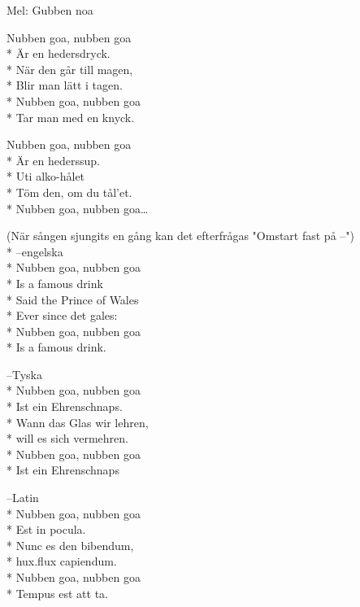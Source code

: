 \begin{SongText}
    \begin{SongInfo}
        Mel: Gubben noa
    \end{SongInfo}
    \begin{SongVerse}
        Nubben goa, nubben goa\\*%
        Är en hedersdryck.\\*%
        När den går till magen,\\*%
        Blir man lätt i tagen.\\*%
        Nubben goa, nubben goa\\*%
        Tar man med en knyck.
    \end{SongVerse}
    \begin{SongVerse}
        Nubben goa, nubben goa\\*%
        Är en hederssup.\\*%
        Uti alko-hålet\\*%
        Töm den, om du tål’et.\\*%
        Nubben goa, nubben goa…
    \end{SongVerse}
    \begin{SongVerse}
        (När sången sjungits en gång kan det efterfrågas "Omstart fast på --")\\*%
        --engelska\\*%
        Nubben goa, nubben goa\\*%
        Is a famous drink\\*%
        Said the Prince of Wales\\*%
        Ever since det gales:\\*%
        Nubben goa, nubben goa\\*%
        Is a famous drink.
    \end{SongVerse}
    \begin{SongVerse}
        --Tyska\\*%
        Nubben goa, nubben goa\\*%
        Ist ein Ehrenschnaps.\\*%
        Wann das Glas wir lehren,\\*%
        will es sich vermehren.\\*%
        Nubben goa, nubben goa\\*%
        Ist ein Ehrenschnaps
    \end{SongVerse}
    \begin{SongVerse}
        --Latin\\*%
        Nubben goa, nubben goa\\*%
        Est in pocula.\\*%
        Nunc es den bibendum,\\*%
        hux.flux capiendum.\\*%
        Nubben goa, nubben goa\\*%
        Tempus est att ta.
    \end{SongVerse}
\end{SongText}
